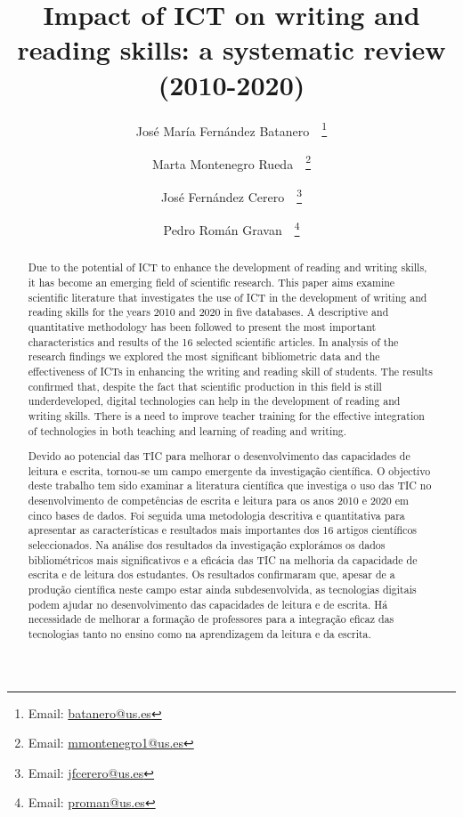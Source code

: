 \documentclass{textolivre}
\title{Impact of ICT on writing and reading skills: a systematic review (2010-2020)}
\author[1]{José María Fernández Batanero~\orcid{0000-0003-4097-5382}~\thanks{Email: \url{batanero@us.es}}}
\author[1]{Marta Montenegro Rueda~\orcid{0000-0003-4733-289X}~\thanks{Email: \url{mmontenegro1@us.es}}}
\author[1]{José Fernández Cerero~\orcid{0000-0002-2745-6986}~\thanks{Email: \url{jfcerero@us.es}}}
\author[1]{Pedro Román Gravan~\orcid{0000-0002-1646-9247}~\thanks{Email: \url{proman@us.es}}}
\affil[1]{Universidad de Sevilla, Facultad de Ciencias de la Educación, Departamento de Didáctica y Organización Educativa, Sevilla, España.}
\begin{document}
\maketitle

\begin{polyabstract}
\begin{abstract}
Due to the potential of ICT to enhance the development of reading and writing skills, it has become an emerging field of scientific research. This paper aims examine scientific literature that investigates the use of ICT in the development of writing and reading skills for the years 2010 and 2020 in five databases. A descriptive and quantitative methodology has been followed to present the most important characteristics and results of the 16 selected scientific articles. In analysis of the research findings we explored the most significant bibliometric data and the effectiveness of ICTs in enhancing the writing and reading skill of students. The results confirmed that, despite the fact that scientific production in this field is still underdeveloped, digital technologies can help in the development of reading and writing skills. There is a need to improve teacher training for the effective integration of technologies in both teaching and learning of reading and writing.

\end{abstract}

\begin{portuguese}
\begin{abstract}
Devido ao potencial das TIC para melhorar o desenvolvimento das capacidades de leitura e escrita, tornou-se um campo emergente da investigação científica. O objectivo deste trabalho tem sido examinar a literatura científica que investiga o uso das TIC no desenvolvimento de competências de escrita e leitura para os anos 2010 e 2020 em cinco bases de dados. Foi seguida uma metodologia descritiva e quantitativa para apresentar as características e resultados mais importantes dos 16 artigos científicos seleccionados. Na análise dos resultados da investigação explorámos os dados bibliométricos mais significativos e a eficácia das TIC na melhoria da capacidade de escrita e de leitura dos estudantes. Os resultados confirmaram que, apesar de a produção científica neste campo estar ainda subdesenvolvida, as tecnologias digitais podem ajudar no desenvolvimento das capacidades de leitura e de escrita. Há necessidade de melhorar a formação de professores para a integração eficaz das tecnologias tanto no ensino como na aprendizagem da leitura e da escrita.

\end{abstract}
\end{portuguese}

\end{polyabstract}
\end{document}
